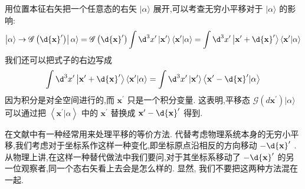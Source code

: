 \documentclass[lang=cn,newtx,10pt,scheme=chinese,thmcnt=section]{elegantbook}
\begin{document}
用位置本征右矢把一个任意态的右矢 $|\alpha \rangle$ 展开,可以考查无穷小平移对于 $|\alpha \rangle$ 的影响:
\begin{equation}
	\left| {\alpha \rangle \rightarrow \mathscr{G} \left( {\d{\mathbf{x}}^{\prime }}\right) }\right| \alpha \rangle = \mathscr{G}\left( {\d{\mathbf{x}}^{\prime }}\right) \int {\d}^{3}{x}^{\prime }\left| {\mathbf{x}}^{\prime }\right\rangle \left\langle {{\mathbf{x}}^{\prime } | \alpha }\right\rangle = \int {\d}^{3}{x}^{\prime }\left| {{\mathbf{x}}^{\prime } + \d{\mathbf{x}}^{\prime }}\right\rangle \left\langle {{\mathbf{x}}^{\prime } | \alpha }\right\rangle
\end{equation}
我们还可以把式子的右边写成
\begin{equation}
	\int {\d}^{3}{x}^{\prime }\left| {{\mathbf{x}}^{\prime } + \d{\mathbf{x}}^{\prime }}\right\rangle \left\langle {{\mathbf{x}}^{\prime } | \alpha }\right\rangle = \int {\d}^{3}{x}^{\prime }\left| {\mathbf{x}}^{\prime }\right\rangle \left\langle {{\mathbf{x}}^{\prime } - \d{\mathbf{x}}^{\prime } | \alpha }\right\rangle
\end{equation}
因为积分是对全空间进行的,而 ${\mathbf{x}}^{\prime }$ 只是一个积分变量. 这表明,平移态 $ \mathscr{G} (d{\mathbf{x}}^{\prime }) |\alpha\rangle$ 可以通过把 $\left\langle {{\mathbf{x}}^{\prime } | \alpha }\right\rangle$ 中的 ${\mathbf{x}}^{\prime }$ 替换成 ${\mathbf{x}}^{\prime } - \d{\mathbf{x}}^{\prime }$ 得到.

在文献中有一种经常用来处理平移的等价方法. 代替考虑物理系统本身的无穷小平移,我们考虑对于坐标系作这样一种变化,即坐标原点沿相反的方向移动 $- \d{\mathbf{x}}^{\prime }$ . 从物理上讲,在这样一种替代做法中我们要问,对于其坐标系移动了 $- \d{\mathbf{x}}^{\prime }$ 的另一位观察者,同一个态右矢看上去会是怎么样的. 显然, 我们不要把这两种方法混在一起.
\end{document}
